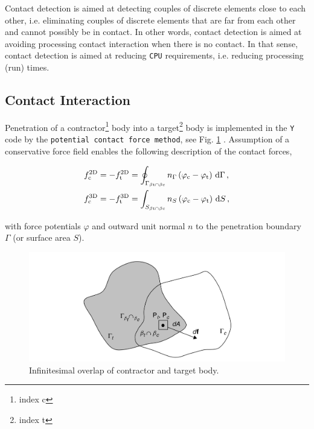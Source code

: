 \documentclass[format=acmtog,12pt,screen=true,review=false,natbib=false,]{acmart}
\begin{document}
\bigbreak
Contact detection is aimed at detecting couples of discrete elements close to each other, i.e. eliminating couples of discrete elements that are far from each other and cannot possibly be in contact. In other words, contact detection is aimed at avoiding processing contact interaction when there is no contact. In that sense, contact detection is aimed at reducing \texttt{CPU} requirements, i.e. reducing processing (run) times. \cite{Mun04}

\subsection{Contact Interaction}

Penetration of a contractor\footnote{index c} body into a target\footnote{index t} body is implemented in the \texttt{Y} code by the \texttt{potential contact force method}, see Fig. \ref{fig:contact} \cite{Mun04}. Assumption of a conservative force field enables the following description of the contact forces,

\begin{align}
    f_{\rm{c}}^{\rm{2D}}&=-f_{\rm{t}}^{\rm{2D}}=\oint_{\Gamma_{\beta{\rm{t}}\cap\beta{\rm{c}}}}n_{\Gamma}\left(\varphi_{\rm{c}}-\varphi_{\rm{t}}\right)\,{\rm{d}}\Gamma\,,\\
    f_{\rm{c}}^{\rm{3D}}&=-f_{\rm{t}}^{\rm{3D}}=\int_{S_{\beta{\rm{t}}\cap\beta{\rm{c}}}}n_{S}\left(\varphi_{\rm{c}}-\varphi_{\rm{t}}\right)\,{\rm{d}}S\,,
\end{align}

with force potentials $\varphi$ and outward unit normal $n$ to the penetration boundary $\Gamma$ (or surface area $S$).

\begin{figure}[!htbp]
    \centering
    \includegraphics[width=\columnwidth]{Contact}
    \caption{Infinitesimal overlap of contractor and target body. \cite{Mun04}}
    \label{fig:contact}
\end{figure}
\end{document}
